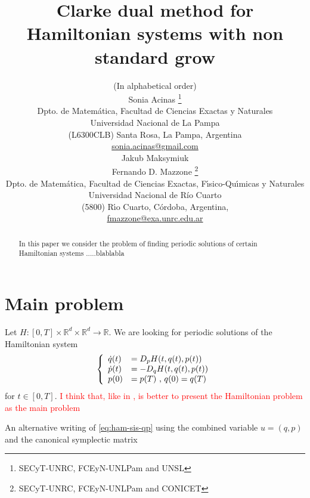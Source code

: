 \documentclass[twoside]{article}
\title{Clarke dual method for Hamiltonian systems with non standard grow}
\author{(In alphabetical order)\\[3mm]
Sonia Acinas \thanks{SECyT-UNRC,  FCEyN-UNLPam and UNSL}\\
Dpto. de Matem\'atica, Facultad de Ciencias Exactas y Naturales\\
Universidad Nacional de La Pampa\\
(L6300CLB) Santa Rosa, La Pampa, Argentina\\
\url{sonia.acinas@gmail.com}\\[3mm]
Jakub Maksymiuk \\[3mm]
 Fernando D. Mazzone \thanks{SECyT-UNRC, FCEyN-UNLPam and CONICET}\\
Dpto. de Matem\'atica, Facultad de Ciencias Exactas, F\'{\i}sico-Qu\'{\i}micas y Naturales\\
Universidad Nacional de R\'{i}o Cuarto\\
(5800) R\'{\i}o Cuarto, C\'ordoba, Argentina,\\
\url{fmazzone@exa.unrc.edu.ar} \\
}
\date{}
\theoremstyle{remark}
\newcommand{\rr}{\mathbb{R}}
\begin{document}
\maketitle
%
\begingroup%
    \renewcommand{\thefootnote}{}%
    \endgroup
%
%
%
%

\begin{abstract}
In this paper we consider the problem of finding periodic solutions of certain Hamiltonian systems .....blablabla

\end{abstract}






\pagestyle{fancy} \headheight 35pt \fancyhead{} \fancyfoot{}

\fancyfoot[C]{\thepage}  \fancyhead[CO]{\nouppercase{\section}}

\fancyhead[CO]{\nouppercase{\leftmark}}



\section{Main problem}
Let $H:[0,T]\times \rr^d\times \rr^d \to \rr$. 
We are looking for periodic solutions of the Hamiltonian system
\begin{equation}\label{eq:ham-sis-qp}
\left\{\begin{array}{ll}
\dot{q}(t)&=D_pH(t,q(t),p(t))\\
\dot{p}(t)&=-D_qH(t,q(t),p(t))\\
p(0)&=p(T)\hbox{ , } q(0)=q(T)
\end{array}
\right.
\end{equation}
for $t \in [0,T]$. \textcolor{red}{I think that, like in \cite{Mawhin2010}, is better to present the Hamiltonian problem as the main problem}


An alternative writing of \eqref{eq:ham-sis-qp} using the combined variable $u=(q,p)$ and the canonical symplectic matrix 
\end{document}
